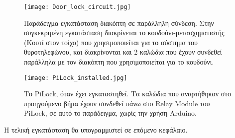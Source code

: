 \begin{figure}[h]
	\centering
		\texttt{[image: Door\_lock\_circuit.jpg]}
	\caption{Παράδειγμα εγκατάσταση διακόπτη σε παράλληλη σύνδεση. Στην συγκεκριμένη εγκατάσταση διακρίνεται το κουδούνι-μετασχηματιστής (Κουτί στον τοίχο) που χρησιμοποιείται για το σύστημα του θυροτηλεφώνου, και διακρίνονται και 2 καλώδια που έχουν συνδεθεί παράλληλα με τον διακόπτη που χρησιμοποιείται για το κουδούνι.}
\end{figure}

\begin{figure}[h!]
	\centering
		\texttt{[image: PiLock\_installed.jpg]}
	\caption{Το PiLock, όταν έχει εγκαταστηθεί. Τα καλώδια που αναρτήθηκαν στο προηγούμενο βήμα έχουν συνδεθεί πάνω στο Relay Module του PiLock, σε αυτό το παράδειγμα, χωρίς την χρήση Arduino.}
\end{figure}

Η τελική εγκατάσταση θα υπογραμμιστεί σε επόμενο κεφάλαιο.